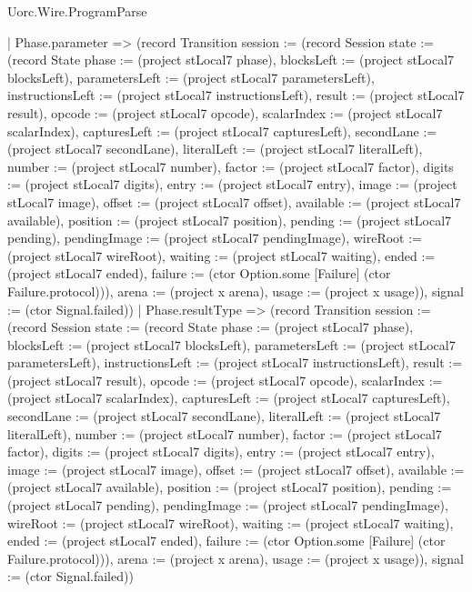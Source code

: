 \begin{lexlean}{Uorc.Wire.ProgramParse}
\begin{semanticmodule}
{    | Phase.parameter => (record Transition {session := (record Session {state := (record State {phase := (project stLocal7 phase), blocksLeft := (project stLocal7 blocksLeft), parametersLeft := (project stLocal7 parametersLeft), instructionsLeft := (project stLocal7 instructionsLeft), result := (project stLocal7 result), opcode := (project stLocal7 opcode), scalarIndex := (project stLocal7 scalarIndex), capturesLeft := (project stLocal7 capturesLeft), secondLane := (project stLocal7 secondLane), literalLeft := (project stLocal7 literalLeft), number := (project stLocal7 number), factor := (project stLocal7 factor), digits := (project stLocal7 digits), entry := (project stLocal7 entry), image := (project stLocal7 image), offset := (project stLocal7 offset), available := (project stLocal7 available), position := (project stLocal7 position), pending := (project stLocal7 pending), pendingImage := (project stLocal7 pendingImage), wireRoot := (project stLocal7 wireRoot), waiting := (project stLocal7 waiting), ended := (project stLocal7 ended), failure := (ctor Option.some [Failure] (ctor Failure.protocol))}), arena := (project x arena), usage := (project x usage)}), signal := (ctor Signal.failed)})
    | Phase.resultType => (record Transition {session := (record Session {state := (record State {phase := (project stLocal7 phase), blocksLeft := (project stLocal7 blocksLeft), parametersLeft := (project stLocal7 parametersLeft), instructionsLeft := (project stLocal7 instructionsLeft), result := (project stLocal7 result), opcode := (project stLocal7 opcode), scalarIndex := (project stLocal7 scalarIndex), capturesLeft := (project stLocal7 capturesLeft), secondLane := (project stLocal7 secondLane), literalLeft := (project stLocal7 literalLeft), number := (project stLocal7 number), factor := (project stLocal7 factor), digits := (project stLocal7 digits), entry := (project stLocal7 entry), image := (project stLocal7 image), offset := (project stLocal7 offset), available := (project stLocal7 available), position := (project stLocal7 position), pending := (project stLocal7 pending), pendingImage := (project stLocal7 pendingImage), wireRoot := (project stLocal7 wireRoot), waiting := (project stLocal7 waiting), ended := (project stLocal7 ended), failure := (ctor Option.some [Failure] (ctor Failure.protocol))}), arena := (project x arena), usage := (project x usage)}), signal := (ctor Signal.failed)})
}
\end{semanticmodule}
\end{lexlean}

